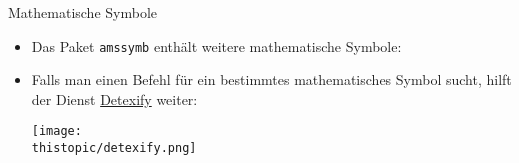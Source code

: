\begin{frame}[t]{Mathematische Symbole}
    \begin{itemize}
        \item Das Paket \texttt{amssymb} enthält weitere mathematische Symbole:
            \begin{center}
            \end{center}
        \item Falls man einen Befehl für ein bestimmtes mathematisches Symbol sucht, hilft der Dienst
            \href{http://detexify.kirelabs.org/classify.html}{\alert{Detexify}} weiter:
            \begin{center}
                \texttt{[image: \\thistopic/detexify.png]}
            \end{center}
    \end{itemize}
\end{frame}
